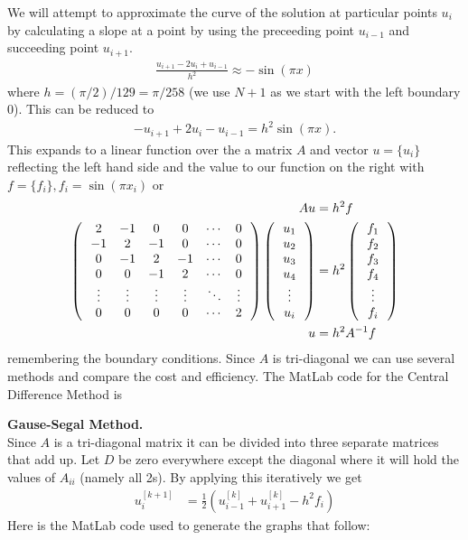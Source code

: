\documentclass[12pt,a4paper]{report}
\begin{document}
We will attempt to approximate the curve of  the solution at particular points $u_i$ by calculating a slope at a point by using the preceeding point $u_{i-1}$ and succeeding point $u_{i+1}$.  
\begin{align*}
	\frac{u_{i+1}-2u_i+u_{i-1}}{h^2} \approx -\sin (\pi x)
\end{align*}where $h=(\pi/2)/129=\pi/258$ (we use $N+1$ as we start with the left boundary 0).  This can be reduced to 
\begin{align*}
	-u_{i+1}+2u_i-u_{i-1} = h^2\sin (\pi x).
\end{align*}This expands to a linear function over the a matrix $A$ and vector $u=\{ u_i \}$ reflecting the left hand side and the value to our function on the right with $f=\{ f_i \}, f_i=\sin(\pi x_i)$ or
\begin{align*}
	Au &= h^2 f\\
	\left (\, \begin{array}{cccccc}
		2 & -1 & 0 & 0 &\cdots & 0\\
		-1 & 2 & -1 & 0 &\cdots & 0\\
		0 & -1 & 2 & -1 &\cdots & 0\\
		0 & 0 &-1 & 2 & \cdots & 0\\
		\vdots & \vdots & \vdots & \vdots &\ddots & \vdots\\
		0 & 0 & 0 & 0 & \cdots & 2
	\end{array}  \,\right ) \left (\, \begin{array}{c}  u_1 \\ u_2 \\ u_3 \\ u_4 \\ \vdots \\ u_i  \end{array}  \,\right ) &= h^2 \left (\, \begin{array}{c}  f_1 \\ f_2 \\ f_3 \\ f_4 \\ \vdots \\ f_i  \end{array}  \,\right ) \\
	u &= h^2 A^{-1} f
\end{align*}remembering the boundary conditions.  Since $A$ is tri-diagonal we can use several methods and compare the cost and efficiency.  The MatLab code for the Central Difference Method is
	

\noindent\textbf{Gause-Segal Method.}\\

Since $A$ is a tri-diagonal matrix it can be divided into three separate matrices that add up.  Let $D$ be zero everywhere except the diagonal where it will hold the values of $A_{ii}$ (namely all 2s).  By applying this iteratively we get
\begin{align*}
	u_i^{[k+1]} &= \frac{1}{2}(u_{i-1}^{[k]}+u_{i+1}^{[k]} - h^2 f_i)
\end{align*}Here is the MatLab code used to generate the graphs that follow:
	
	
\end{document}
